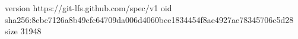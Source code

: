 version https://git-lfs.github.com/spec/v1
oid sha256:8ebc7126a8b49cfc64709da006d4060bce1834454f8ae4927ae78345706c5d28
size 31948
